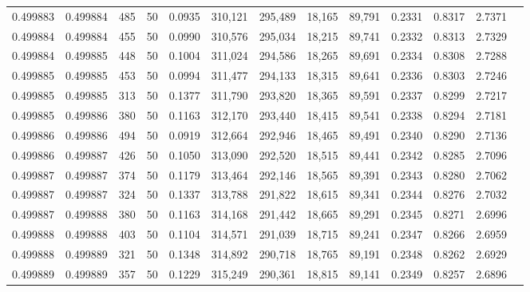 \begin{tabular}{rrrrrrrrrrrrr}
0.499883 & 0.499884 &   485 &  50 &                                     0.0935 & 310,121 & 295,489 &  18,165 &  89,791 & 0.2331 & 0.8317 & 2.7371 \\
0.499884 & 0.499884 &   455 &  50 &                                     0.0990 & 310,576 & 295,034 &  18,215 &  89,741 & 0.2332 & 0.8313 & 2.7329 \\
0.499884 & 0.499885 &   448 &  50 &                                     0.1004 & 311,024 & 294,586 &  18,265 &  89,691 & 0.2334 & 0.8308 & 2.7288 \\
0.499885 & 0.499885 &   453 &  50 &                                     0.0994 & 311,477 & 294,133 &  18,315 &  89,641 & 0.2336 & 0.8303 & 2.7246 \\
0.499885 & 0.499885 &   313 &  50 &                                     0.1377 & 311,790 & 293,820 &  18,365 &  89,591 & 0.2337 & 0.8299 & 2.7217 \\
0.499885 & 0.499886 &   380 &  50 &                                     0.1163 & 312,170 & 293,440 &  18,415 &  89,541 & 0.2338 & 0.8294 & 2.7181 \\
0.499886 & 0.499886 &   494 &  50 &                                     0.0919 & 312,664 & 292,946 &  18,465 &  89,491 & 0.2340 & 0.8290 & 2.7136 \\
0.499886 & 0.499887 &   426 &  50 &                                     0.1050 & 313,090 & 292,520 &  18,515 &  89,441 & 0.2342 & 0.8285 & 2.7096 \\
0.499887 & 0.499887 &   374 &  50 &                                     0.1179 & 313,464 & 292,146 &  18,565 &  89,391 & 0.2343 & 0.8280 & 2.7062 \\
0.499887 & 0.499887 &   324 &  50 &                                     0.1337 & 313,788 & 291,822 &  18,615 &  89,341 & 0.2344 & 0.8276 & 2.7032 \\
0.499887 & 0.499888 &   380 &  50 &                                     0.1163 & 314,168 & 291,442 &  18,665 &  89,291 & 0.2345 & 0.8271 & 2.6996 \\
0.499888 & 0.499888 &   403 &  50 &                                     0.1104 & 314,571 & 291,039 &  18,715 &  89,241 & 0.2347 & 0.8266 & 2.6959 \\
0.499888 & 0.499889 &   321 &  50 &                                     0.1348 & 314,892 & 290,718 &  18,765 &  89,191 & 0.2348 & 0.8262 & 2.6929 \\
0.499889 & 0.499889 &   357 &  50 &                                     0.1229 & 315,249 & 290,361 &  18,815 &  89,141 & 0.2349 & 0.8257 & 2.6896 \\

\end{tabular}
